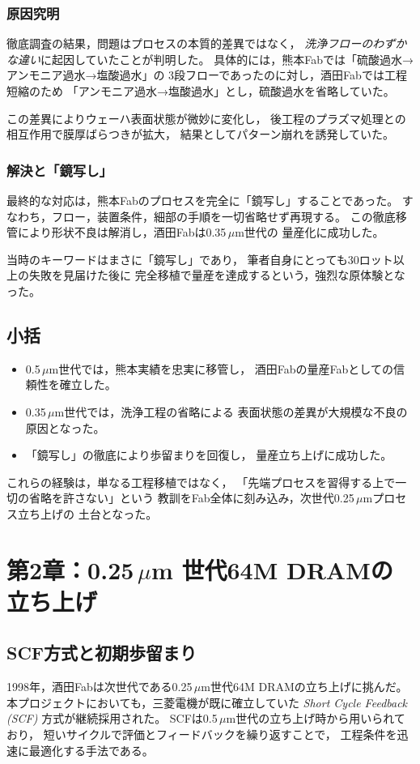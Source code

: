 \documentclass[conference]{IEEEtran}
\begin{document}
\subsubsection{原因究明}
徹底調査の結果，問題はプロセスの本質的差異ではなく，
\emph{洗浄フローのわずかな違い}に起因していたことが判明した。
具体的には，熊本Fabでは「硫酸過水→アンモニア過水→塩酸過水」の
3段フローであったのに対し，酒田Fabでは工程短縮のため
「アンモニア過水→塩酸過水」とし，硫酸過水を省略していた。

この差異によりウェーハ表面状態が微妙に変化し，
後工程のプラズマ処理との相互作用で膜厚ばらつきが拡大，
結果としてパターン崩れを誘発していた。

\subsubsection{解決と「鏡写し」}
最終的な対応は，熊本Fabのプロセスを完全に「鏡写し」することであった。
すなわち，フロー，装置条件，細部の手順を一切省略せず再現する。
この徹底移管により形状不良は解消し，酒田Fabは0.35\,$\mu$m世代の
量産化に成功した。

当時のキーワードはまさに「鏡写し」であり，
筆者自身にとっても30ロット以上の失敗を見届けた後に
完全移植で量産を達成するという，強烈な原体験となった。

\subsection{小括}
\begin{itemize}
  \item 0.5\,$\mu$m世代では，熊本実績を忠実に移管し，
        酒田Fabの量産Fabとしての信頼性を確立した。
  \item 0.35\,$\mu$m世代では，洗浄工程の省略による
        表面状態の差異が大規模な不良の原因となった。
  \item 「鏡写し」の徹底により歩留まりを回復し，
        量産立ち上げに成功した。
\end{itemize}

これらの経験は，単なる工程移植ではなく，
「先端プロセスを習得する上で一切の省略を許さない」という
教訓をFab全体に刻み込み，次世代0.25\,$\mu$mプロセス立ち上げの
土台となった。

\section{第2章：0.25\,\texorpdfstring{$\mu$m}{μm} 世代64M DRAMの立ち上げ}

\subsection{SCF方式と初期歩留まり}
1998年，酒田Fabは次世代である0.25\,$\mu$m世代64M DRAMの立ち上げに挑んだ。
本プロジェクトにおいても，三菱電機が既に確立していた
\emph{Short Cycle Feedback (SCF)} 方式が継続採用された。
SCFは0.5\,$\mu$m世代の立ち上げ時から用いられており，
短いサイクルで評価とフィードバックを繰り返すことで，
工程条件を迅速に最適化する手法である。
\end{document}

